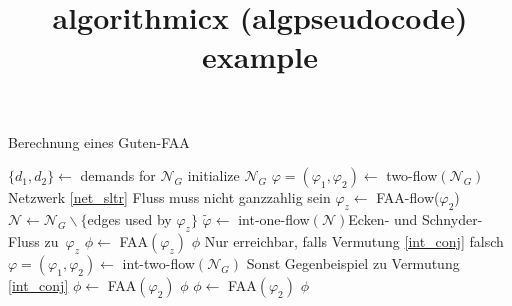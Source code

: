 \documentclass[11pt]{article}
\title{algorithmicx (algpseudocode) example}
\begin{document}
\begin{algorithm}
\caption{Berechnung eines Guten-FAA}
\label{algo_sltr}
\begin{algorithmic}[1]
	\State $\{d_1,d_2\} \gets $ demands for $\mathcal{N}_G$
	\State initialize $\mathcal{N}_G$
	\State $\varphi=(\varphi_1,\varphi_2) \gets $ two-flow$(\mathcal{N}_G)$\Comment Netzwerk \ref{net_sltr}
	\Comment Fluss muss nicht ganzzahlig sein
			\State $\varphi_z \gets$ FAA-flow($\varphi_2$)
			\State $\mathcal{N} \gets \mathcal{N}_G \backslash \{$edges used by $\varphi_z\}$
			\State $\tilde{\varphi} \gets $ int-one-flow$(\mathcal{N})$\Comment Ecken- und Schnyder-Fluss zu $\varphi_z$
				\State $\phi \gets $ FAA$(\varphi_z)$
				\State \Return $\phi$
			\Else \Comment Nur erreichbar, falls Vermutung \ref{int_conj} falsch
				\State $\varphi=(\varphi_1,\varphi_2) \gets $ int-two-flow$(\mathcal{N}_G)$
				\Comment Sonst Gegenbeispiel zu Vermutung \ref{int_conj}
					\State $\phi \gets $ FAA$(\varphi_2)$
					\State \Return $\phi$
				\EndIf
			\EndIf
		\Else
			\State $\phi \gets $ FAA$(\varphi_2)$
		\EndIf
	\EndIf
	\State \Return $\phi$
\EndIf
\EndProcedure
\end{algorithmic}
\end{algorithm}
\end{document}
